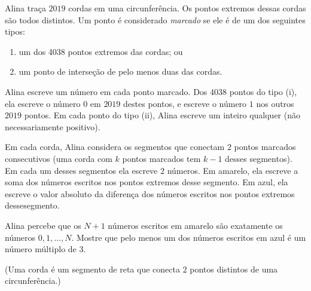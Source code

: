 Alina traça $2019$ cordas em uma circunferência. Os pontos extremos dessas cordas são todos distintos.
Um ponto é considerado \textit{marcado} se ele é de um dos seguintes tipos:

\begin{enumerate}[label = (\alpha*)]
	\item um dos 4038 pontos extremos das cordas; ou
	\item um ponto de interseção de pelo menos duas das cordas.
\end{enumerate}

Alina escreve um número em cada ponto marcado.
Dos 4038 pontos do tipo (i), ela escreve o número $0$ em $2019$ destes pontos, e escreve o número $1$ nos outros $2019$ pontos.
Em cada ponto do tipo (ii), Alina escreve um inteiro qualquer (não necessariamente positivo).

Em cada corda, Alina considera os segmentos que conectam $2$ pontos marcados consecutivos (uma corda com $k$ pontos marcados tem $k−1$ desses segmentos).
Em cada um desses segmentos ela escreve $2$ números.
Em amarelo, ela escreve a soma dos números escritos nos pontos extremos desse segmento.
Em azul, ela escreve o valor absoluto da diferença dos números escritos nos pontos extremos dessesegmento.

Alina percebe que os $N+1$ números escritos em amarelo são exatamente os números $0, 1, \dots, N$.
Mostre que pelo menos um dos números escritos em azul é um número múltiplo de 3.

(Uma corda é um segmento de reta que conecta $2$ pontos distintos de uma circunferência.)
